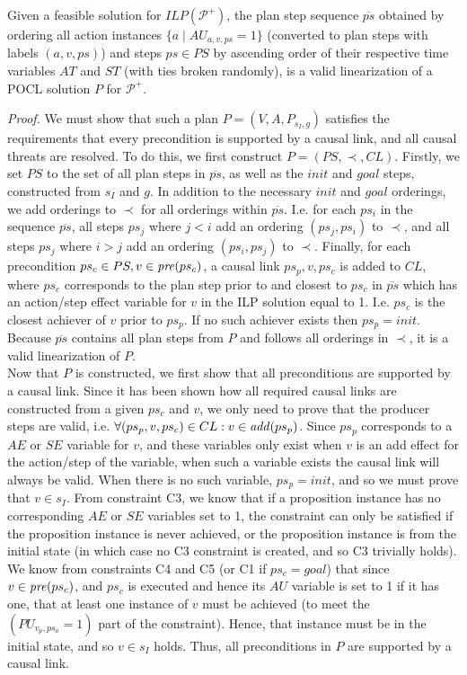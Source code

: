 \begin{thm}
Given a feasible solution for $\mathit{ILP}(\mathcal{P}^+)$, the plan step sequence $\overline{ps}$ obtained by ordering all action instances $\{a\mid AU_{a,v,ps}=1\}$ (converted to plan steps with labels $(a,v,ps)$) and steps $ps\in PS$ by ascending order of their respective time variables $AT$ and $ST$ (with ties broken randomly), is a valid linearization of a POCL solution $P$ for $\mathcal{P}^+$.
\end{thm}
\textit{Proof.} We must show that such a plan $P=(V,A,P_{s_I,g})$ satisfies the requirements that every precondition is supported by a causal link, and all causal threats are resolved. To do this, we first construct $P=(PS,\prec,CL)$. Firstly, we set $PS$ to the set of all plan steps in $\overline{ps}$, as well as the $\mathit{init}$ and $\mathit{goal}$ steps, constructed from $s_I$ and $g$. In addition to the necessary $\mathit{init}$ and $\mathit{goal}$ orderings, we add orderings to $\prec$ for all orderings within $\overline{ps}$. I.e. for each $ps_i$ in the sequence $\overline{ps}$, all steps $ps_j$ where $j<i$ add an ordering $(ps_j,ps_i)$ to $\prec$, and all steps $ps_j$ where $i>j$ add an ordering $(ps_i,ps_j)$ to $\prec$. Finally, for each precondition $ps_c\in PS,v\in\mathit{pre}(ps_c)$, a causal link $ps_p,v,ps_c$ is added to $CL$, where $ps_c$ corresponds to the plan step prior to and closest to $ps_c$ in $\overline{ps}$ which has an action/step effect variable for $v$ in the ILP solution equal to 1. I.e. $ps_c$ is the closest achiever of $v$ prior to $ps_p$. If no such achiever exists then $ps_p=\mathit{init}$. Because $\overline{ps}$ contains all plan steps from $P$ and follows all orderings in $\prec$, it is a valid linearization of $P$. \\


Now that $P$ is constructed, we first show that all preconditions are supported by a causal link. Since it has been shown how all required causal links are constructed from a given $ps_c$ and $v$, we only need to prove that the producer steps are valid, i.e. $\forall (ps_p,v,ps_c)\in CL: v\in\mathit{add}(ps_p)$. Since $ps_p$ corresponds to a $AE$ or $SE$ variable for $v$, and these variables only exist when $v$ is an add effect for the action/step of the variable, when such a variable exists the causal link will always be valid. When there is no such variable, $ps_p=\mathit{init}$, and so we must prove that $v\in s_I$. From constraint C3, we know that if a proposition instance has no corresponding $AE$ or $SE$ variables set to 1, the constraint can only be satisfied if the proposition instance is never achieved, or the proposition instance is from the initial state (in which case no C3 constraint is created, and so C3 trivially holds). We know from constraints C4 and C5 (or C1 if $ps_c=\mathit{goal}$) that since $v\in\mathit{pre}(ps_c)$, and $ps_c$ is executed and hence its $AU$ variable is set to 1 if it has one, that at least one instance of $v$ must be achieved (to meet the $(PU_{v_p,ps_a}=1)$ part of the constraint). Hence, that instance must be in the initial state, and so $v\in s_I$ holds. Thus, all preconditions in $P$ are supported by a causal link.\\


